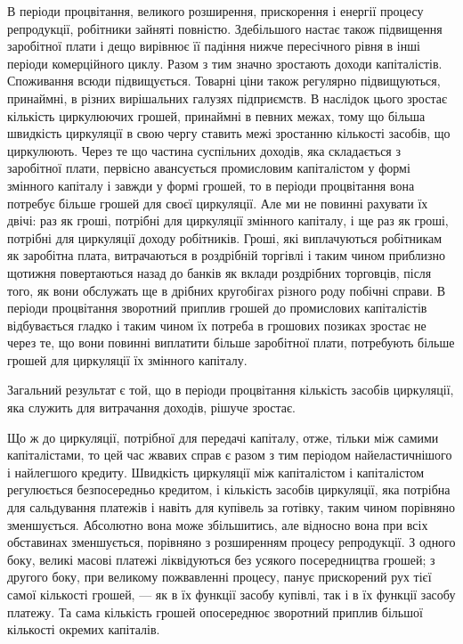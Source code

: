 В періоди процвітання, великого розширення, прискорення
і енергії процесу репродукції, робітники зайняті повністю. Здебільшого настає також підвищення
заробітної плати і дещо вирівнює її падіння нижче пересічного рівня в інші періоди комерційного
циклу. Разом з тим значно зростають доходи капіталістів. Споживання всюди підвищується.
Товарні ціни також
регулярно підвищуються, принаймні, в різних вирішальних галузях підприємств. В наслідок цього
зростає кількість циркулюючих грошей, принаймні в певних межах, тому що більша
швидкість циркуляції в свою чергу ставить межі зростанню кількості засобів, що циркулюють. Через те
що частина суспільних
доходів, яка складається з заробітної плати, первісно авансується промисловим капіталістом у формі
змінного капіталу
і завжди у формі грошей, то в періоди процвітання вона потребує більше грошей для своєї циркуляції.
Але ми не повинні
рахувати їх двічі: раз як гроші, потрібні для циркуляції змінного капіталу, і ще раз як гроші,
потрібні для циркуляції доходу робітників. Гроші, які виплачуються робітникам як заробітна плата,
витрачаються в роздрібній торгівлі і таким чином
приблизно щотижня повертаються назад до банків як вклади роздрібних торговців, після того, як вони
обслужать ще в дрібних
кругобігах різного роду побічні справи. В періоди процвітання
зворотний приплив грошей до промислових капіталістів відбувається гладко і таким чином їх потреба в
грошових позиках
зростає не через те, що вони повинні виплатити більше заробітної плати, потребують більше грошей для
циркуляції їх змінного капіталу.

Загальний результат є той, що в періоди процвітання кількість засобів циркуляції, яка служить для
витрачання доходів,
рішуче зростає.

Що ж до циркуляції, потрібної для передачі капіталу, отже,
тільки між самими капіталістами, то цей час жвавих справ
є разом з тим періодом найеластичнішого і найлегшого кредиту. Швидкість циркуляції між капіталістом
і капіталістом
регулюється безпосередньо кредитом, і кількість засобів циркуляції, яка потрібна для сальдування
платежів і навіть для купівель за готівку, таким чином порівняно зменшується. Абсолютно
вона може збільшитись, але відносно вона при всіх обставинах зменшується, порівняно з розширенням
процесу репродукції. З одного боку, великі масові платежі ліквідуються без усякого посередництва
грошей; з другого боку, при великому пожвавленні процесу, панує прискорений рух тієї самої кількості
грошей, — як в їх функції засобу купівлі, так і в їх функції засобу платежу. Та сама кількість
грошей опосереднює зворотний
приплив більшої кількості окремих капіталів.

